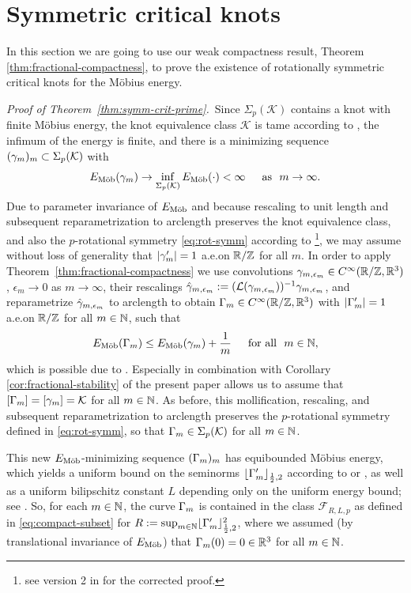 \section{Symmetric critical knots}\label{sec:symm-critical}
In this section we are going to use our weak compactness result, Theorem
\ref{thm:fractional-compactness}, to prove the existence of rotationally
symmetric critical knots for the M\"obius energy.

{\it Proof of Theorem~\ref{thm:symm-crit-prime}.}\,
Since $\Sigma_p(\mathcal{K})$ contains a knot with finite M\"obius energy,
the knot equivalence class $\mathcal{K}$ is tame according to
\cite[Theorem~4.1]{freedman-etal_1994}, 
the infimum of the energy is finite, and there is a minimizing sequence
$(\gamma_m)_m\subset\Sigma_p(\mathcal{K})$ with 
$$
{E_\textnormal{M\"ob}}(\gamma_m)\to\inf_{\Sigma_p(\mathcal{K})}{E_\textnormal{M\"ob}}(\cdot)<\infty\quad
\,\,\,\text{as }\,\, m\to\infty.
$$
Due to parameter invariance of ${E_\textnormal{M\"ob}}$ and because
rescaling to unit length and subsequent
reparametrization to arclength preserves the knot equivalence class,
and also the $p$-rotational symmetry 
\eqref{eq:rot-symm} according to 
\cite[Lemma 4.6]{gilsbach-vdm_2018}\footnote{see
 version 2 in \cite[Lemma 4.6]{gilsbach-vdm_2017} for the corrected proof.},
we may assume without loss
of generality that $|\gamma_m'|=1$  a.e.\@ on $\mathbb{R}/\mathbb{Z}$ for all $m$. In order
to apply Theorem~\ref{thm:fractional-compactness} we use convolutions
$\gamma_{m,\epsilon_m}\in C^\infty(\mathbb{R}/\mathbb{Z},\mathbb{R}^3)$, $\epsilon_m\to 0 $ as 
$m\to\infty$, 
their
rescalings $\hat{\gamma}_{m,\epsilon_m}:=(\mathcal{L}(\gamma_{m,\epsilon_m}))^{-1}
\gamma_{m,\epsilon_m}$, and reparametrize $\hat{\gamma}_{m,\epsilon_m}$ to 
arclength to obtain $\Gamma_m\in C^\infty(\mathbb{R}/\mathbb{Z},\mathbb{R}^3)$ with $|\Gamma_m'|=1$
a.e.\@ on $\mathbb{R}/\mathbb{Z}$ for all $m\in\mathbb{N}$, such that
$$
{E_\textnormal{M\"ob}}(\Gamma_m)\le{E_\textnormal{M\"ob}}(\gamma_m)+\frac1{m}\quad\,\,\,\text{for all }\,\, m\in\mathbb{N},
$$
which is possible due to
\cite[Theorems 1.1, 1.3 \& 1.4]{blatt_2019b}. Especially 
\cite[Theorem~1.3]{blatt_2019b} in combination with Corollary 
\ref{cor:fractional-stability}
of the present paper allows us to assume that $[\Gamma_m]=[\gamma_m]=
\mathcal{K}$ for all $m\in\mathbb{N}$.
As before, this mollification,
 rescaling, and
 subsequent reparametrization to arclength preserves the 
 $p$-rotational
 symmetry defined in \eqref{eq:rot-symm},
 so that $\Gamma_m\in\Sigma_p(\mathcal{K})$ for  all $m\in\mathbb{N}$.

 This new ${E_\textnormal{M\"ob}}$-minimizing sequence $(\Gamma_m)_m$ has
 equibounded M\"obius energy, which yields a uniform bound on the 
 seminorms $\lfloor \Gamma_m'\rfloor_{\frac12,2}$ according to
  \cite[Theorem~1.1]{blatt_2012a}
 or \cite[Theorem~3.2(i)]{gilsbach-vdm_2018}, as well as a uniform bilipschitz constant
 $L$ depending only on the uniform energy bound; see 
 \cite[Theorem~2.3]{ohara_1992a}.
 So, for each $m\in\mathbb{N}$, the curve $\Gamma_m$ is contained in the class
 $\mathcal{F}_{R,L,p}$ as defined in 
 \eqref{eq:compact-subset}
 for $R:=\sup_{m\in\mathbb{N}}\lfloor \Gamma_m'\rfloor^2_{\frac12,2}$,
 where we assumed (by translational invariance of ${E_\textnormal{M\"ob}}$) that 
 $\Gamma_m(0)=0\in\mathbb{R}^3$ for all $m\in\mathbb{N}$.

